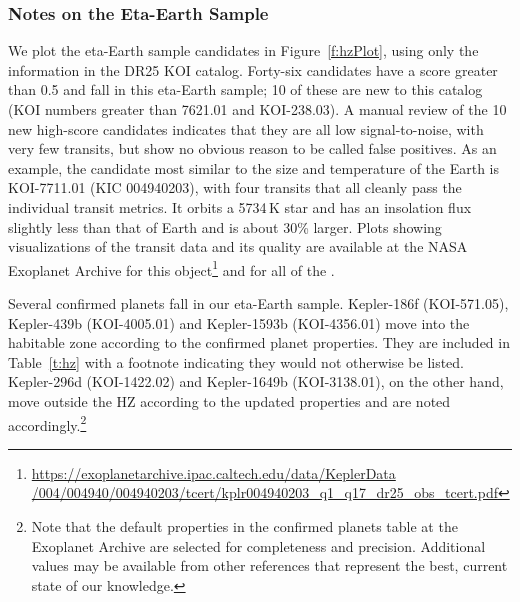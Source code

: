 \subsubsection{Notes on the Eta-Earth Sample}
We plot the eta-Earth sample candidates in Figure~\ref{f:hzPlot}, using only the information in the DR25 KOI catalog.  Forty-six candidates have a score greater than 0.5 and fall in this eta-Earth sample; 10 of these are new to this catalog (KOI numbers greater than 7621.01 and KOI-238.03).  A manual review of the 10 new high-score candidates indicates that they are all low signal-to-noise, with very few transits, but show no obvious reason to be called false positives. As an example, the candidate most similar to the size and temperature of the Earth is KOI-7711.01 (KIC 004940203), with four transits that all cleanly pass the individual transit metrics. It orbits a 5734\,K star and has an insolation flux slightly less than that of Earth and is about 30\% larger.  Plots showing visualizations of the transit data and its quality are available at the NASA Exoplanet Archive for this object\footnote{\url{https://exoplanetarchive.ipac.caltech.edu/data/KeplerData /004/004940/004940203/tcert/kplr004940203\_q1\_q17\_dr25\_obs\_tcert.pdf}} and for all of the .

Several confirmed planets fall in our eta-Earth sample.  Kepler-186f (KOI-571.05), Kepler-439b (KOI-4005.01) and Kepler-1593b (KOI-4356.01) move into the habitable zone according to the confirmed planet properties. They are included in Table~\ref{t:hz} with a footnote indicating they would not otherwise be listed. Kepler-296d (KOI-1422.02) and Kepler-1649b (KOI-3138.01), on the other hand, move outside the HZ according to the updated properties and are noted accordingly.\footnote{Note that the default properties in the confirmed planets table at the Exoplanet Archive are selected for completeness and precision. Additional values may be available from other references that represent the best, current state of our knowledge.} 

